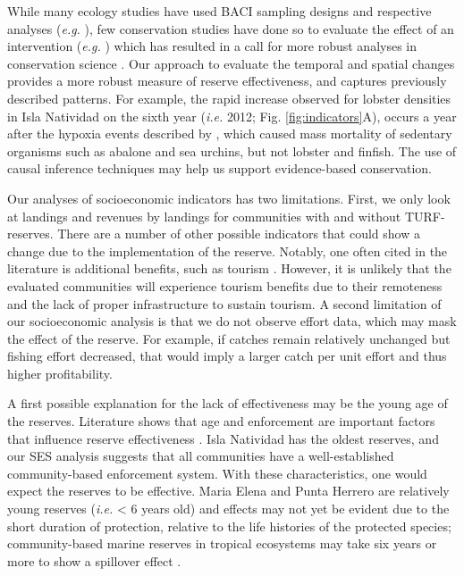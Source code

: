 \documentclass{frontiersSCNS}
\begin{document}
While many ecology studies have used BACI sampling designs and
respective analyses (\emph{e.g.} \citet{stewartoaten_1986}), few
conservation studies have done so to evaluate the effect of an
intervention (\emph{e.g.}
\citet{francinifilho_2008,lester_2009,moland_2013}) which has resulted
in a call for more robust analyses in conservation science
\citep{guidetti_2002,ferraro_2006}. Our approach to evaluate the
temporal and spatial changes provides a more robust measure of reserve
effectiveness, and captures previously described patterns. For example,
the rapid increase observed for lobster densities in Isla Natividad on
the sixth year (\emph{i.e.} 2012; Fig. \ref{fig:indicators}A), occurs a
year after the hypoxia events described by \citet{micheli_2012-EU},
which caused mass mortality of sedentary organisms such as abalone and
sea urchins, but not lobster and finfish. The use of causal inference
techniques may help us support evidence-based conservation.

Our analyses of socioeconomic indicators has two limitations. First, we
only look at landings and revenues by landings for communities with and
without TURF-reserves. There are a number of other possible indicators
that could show a change due to the implementation of the reserve.
Notably, one often cited in the literature is additional benefits, such
as tourism \citep{viana_2017}. However, it is unlikely that the
evaluated communities will experience tourism benefits due to their
remoteness and the lack of proper infrastructure to sustain tourism. A
second limitation of our socioeconomic analysis is that we do not
observe effort data, which may mask the effect of the reserve. For
example, if catches remain relatively unchanged but fishing effort
decreased, that would imply a larger catch per unit effort and thus
higher profitability.

A first possible explanation for the lack of effectiveness may be the
young age of the reserves. Literature shows that age and enforcement are
important factors that influence reserve effectiveness
\citep{edgar_2014-UO,babcock_2010}. Isla Natividad has the oldest
reserves, and our SES analysis suggests that all communities have a
well-established community-based enforcement system. With these
characteristics, one would expect the reserves to be effective. Maria
Elena and Punta Herrero are relatively young reserves (\emph{i.e.}
\textless{} 6 years old) and effects may not yet be evident due to the
short duration of protection, relative to the life histories of the
protected species; community-based marine reserves in tropical
ecosystems may take six years or more to show a spillover effect
\citep{dasilva_2015-zX}.
\end{document}

